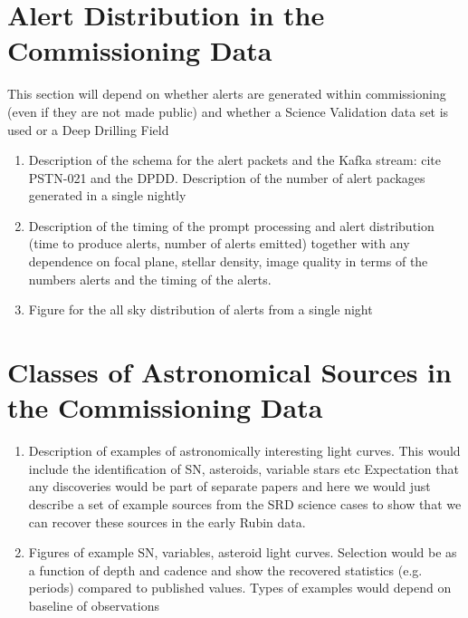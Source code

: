 \section{Alert Distribution in the Commissioning Data}

This section will depend on whether alerts are generated within commissioning (even if they are not made public) and whether a Science Validation data set is used or 
a Deep Drilling Field

\begin{enumerate}

    \item Description of the schema for the alert packets and the Kafka stream: cite PSTN-021 and the DPDD. Description of the number of 
    alert packages generated in a single nightly
    \item Description of the timing of the prompt processing and alert distribution (time to produce alerts, number of alerts emitted) together with
    any dependence on focal plane, stellar density, image quality in terms of the numbers alerts and the timing of the alerts.
    \item Figure for the all sky distribution of alerts from a single night
    
\end{enumerate}

\section{Classes of Astronomical Sources in the Commissioning Data}

\begin{enumerate}

    \item Description of examples of astronomically interesting light curves. This would include the identification of SN, asteroids, variable stars etc Expectation that 
    any discoveries would be part of separate papers and here we would just describe a set of example sources from the SRD science cases to show
    that we can recover these sources in the early Rubin data.
    \item Figures of example SN, variables, asteroid light curves. Selection would be as a function of depth and cadence and show the recovered statistics (e.g. periods)
    compared to published values. Types of examples would depend on baseline of observations 
    
\end{enumerate}


